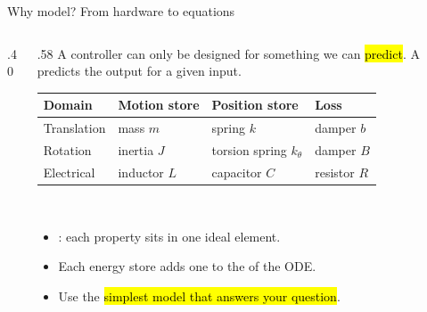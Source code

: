 \documentclass[aspectratio=169,10pt]{beamer}
\begin{document}
\begin{frame}{Why model? From hardware to equations}
\begin{columns}[T]
\begin{column}{.40\textwidth}
\centering
{}
\end{column}
\begin{column}{.58\textwidth}
\small
A controller can only be designed for something we can \hl{predict}. A  predicts the output for a given input.\\[1mm]
\renewcommand{\arraystretch}{1.12}
\begin{tabular}{@{}llll@{}}
\toprule
\textbf{Domain} & \textbf{Motion store} & \textbf{Position store} & \textbf{Loss}\\
\midrule
Translation & mass $m$ & spring $k$ & damper $b$\\
Rotation & inertia $J$ & torsion spring $k_\theta$ & damper $B$\\
Electrical & inductor $L$ & capacitor $C$ & resistor $R$\\
\bottomrule
\end{tabular}\\[1mm]
\begin{itemize}\setlength\itemsep{1pt}
\item {}: each property sits in one ideal element.
\item Each energy store adds one to the  of the ODE.
\item Use the \hl{simplest model that answers your question}.
\end{itemize}
\end{column}
\end{columns}
\end{frame}
\end{document}
